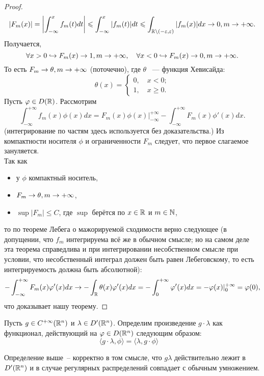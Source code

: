 \begin{proof}
    \[
    |F_m(x)| = \left|\int_{-\infty}^x f_m(t)dt\right| \leqslant \int_{-\infty}^x |f_m(t)|dt \leqslant \int_{\mathbb{R} \setminus (-\varepsilon, \varepsilon)} |f_m(x)|dx \rightarrow 0, m \rightarrow +\infty.
    \]
    Получается,
    \[
    \forall x > 0 \hookrightarrow F_m(x) \rightarrow 1, m \rightarrow +\infty, \quad \forall x < 0 \hookrightarrow F_m(x) \rightarrow 0, m \rightarrow +\infty.
    \]
    То есть $F_m \rightarrow \theta, m \rightarrow +\infty$ (поточечно), где $\theta$ ~--- функция Хевисайда:
    \[
    \theta(x) = \begin{cases}
                   0,\quad x < 0; \\
                   1,\quad x \geq 0.
        \end{cases}
    \]
    Пусть $\varphi \in D(\mathbb{R})$. Рассмотрим
    \[
        \int_{-\infty}^{+\infty} f_m(x)\phi(x)dx = F_m(x)\phi(x)\bigg|^{+\infty}_{-\infty} - \int_{-\infty}^{+\infty} F_m(x)\phi'(x)dx.
    \]
    (интегрирование по частям здесь используется без доказательства.)
    Из компактности носителя $\phi$ и ограниченности $F_m$ следует, что первое слагаемое зануляется.\\
    Так как 
    \begin{itemize}
        \item у $\phi$ компактный носитель,
        \item $F_m \rightarrow \theta, m \rightarrow +\infty$,
        \item $\sup |F_m| \leq C$, где $\sup$ берётся по $x\in \mathbb{R}$ и $m \in \mathbb{N}$,
    \end{itemize}
    то по теореме Лебега о мажорируемой сходимости верно следующее (в допущении, что $f_m$ интегрируема всё же в обычном смысле; но на самом деле эта теорема справедлива и при интегрировании несобственном смысле при условии, что несобственный интеграл должен быть равен Лебеговскому, то есть интегрируемость должна быть абсолютной):
    \[
        -\int_{-\infty}^{+\infty} F_m(x)\varphi'(x)dx \rightarrow -\int_{\mathbb{R}} \theta(x)\varphi'(x)dx = -\int_0^{+\infty} \varphi'(x)dx = -\varphi(x)|^{+\infty}_0 = \varphi(0),
    \]
    что доказывает нашу теорему.
\end{proof}
\begin{definition}
    Пусть $g \in C^{+\infty}(\mathbb{R}^n)$ и $\lambda \in D'(\mathbb{R}^n)$.
    Определим произведение $g\cdot\lambda$ как функционал, действующий на $\varphi \in D(\mathbb{R}^n)$ следующим образом:
    \[
        \langle g \cdot \lambda, \phi \rangle = \langle \lambda, g \cdot \phi \rangle \quad \tag{$\ast$}
    \]
\end{definition}
\begin{theorem}
    Определение выше~-- корректно в том смысле, что $g\lambda$ действительно лежит в $D'(\mathbb{R}^n)$ и в случае регулярных распределений совпадает с обычным умножением.
\end{theorem}
